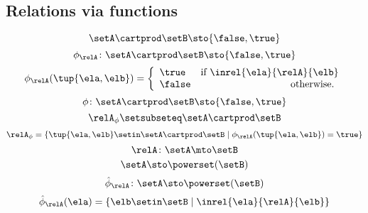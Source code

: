 \begin{forslides}
\subsection{Relations via functions}

\begin{equation}\label{eq:slides_session2_110}
\setA \cartprod \setB \sto \{ \false, \true \}
\end{equation}
 \begin{equation}\label{eq:slides_session2_111}
\phi_{\relA} \colon \setA \cartprod \setB \sto \{ \false, \true \}
\end{equation}
\begin{equation}\label{eq:slides_session2_112}
\phi_{\relA}(\tup{\ela, \elb}) =
              \left
              \{\begin{array}{lr}
                  \true  & \text{if } \inrel{\ela}{\relA}{\elb} \\
                  \false & \text{otherwise.
                  }
              \end{array}
              \right.
\end{equation}
 \begin{equation}\label{eq:slides_session2_113}
\phi\colon \setA \cartprod \setB \sto \{ \false, \true \}
\end{equation}
\begin{equation}\label{eq:slides_session2_114}
\relA_{\phi} \setsubseteq \setA \cartprod \setB
\end{equation}
 \begin{equation}\label{eq:slides_session2_115}
\relA_{\phi} = \{ \tup{\ela, \elb} \setin \setA \cartprod \setB \mid \phi_{\relA}(\tup{\ela, \elb}) = \true \}
\end{equation}
\begin{equation}\label{eq:slides_session2_116}
\relA \colon \setA \mto \setB
\end{equation}
 \begin{equation}\label{eq:slides_session2_117}
\setA  \sto \powerset (\setB)
\end{equation}
\begin{equation}\label{eq:slides_session2_118}
\hat \phi_{\relA} \colon \setA \sto \powerset (\setB)
\end{equation}
 \begin{equation}\label{eq:slides_session2_119}
\hat \phi_{\relA} (\ela) = \{ \elb \setin \setB \mid \inrel{\ela}{\relA}{\elb}\}
\end{equation}
\begin{equation}\label{eq:slides_session2_120}

\end{equation}
\end{forslides}
